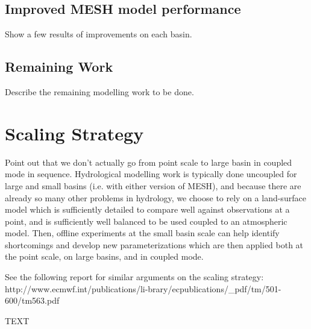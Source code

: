 \documentclass[hess]{copernicus}
\begin{document}
\subsection{Improved MESH model performance}
Show a few results of improvements on each basin.

\subsection{Remaining Work}
Describe the remaining modelling work to be done.

\section{Scaling Strategy}
Point out that we don't actually go from point scale to large basin in coupled mode in sequence. Hydrological modelling work is typically done uncoupled for large and small basins (i.e. with either version of MESH), and because there are already so many other problems in hydrology, we choose to rely on a land-surface model which is sufficiently detailed to compare well against observations at a point, and is sufficiently well balanced to be used coupled to an atmospheric model. Then, offline experiments at the small basin scale can help identify shortcomings and develop new parameterizations which are then applied both at the point scale, on large basins, and in coupled mode.

See the following report for similar arguments on the scaling strategy: http://www.ecmwf.int/publications/li-brary/ecpublications/\_pdf/tm/501-600/tm563.pdf


\conclusions




%




\begin{acknowledgements}
TEXT
\end{acknowledgements}
\end{document}
